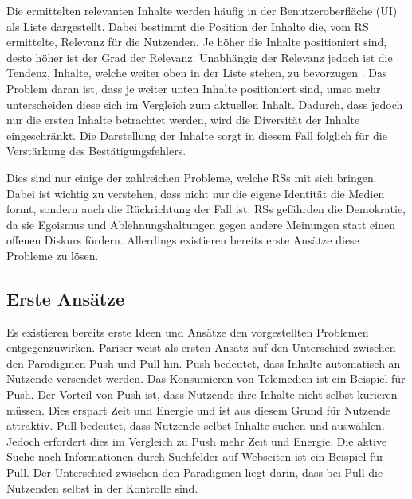 Die ermittelten relevanten Inhalte werden häufig in der Benutzeroberfläche (\ac{UI}) als Liste dargestellt.
Dabei bestimmt die Position der Inhalte die, vom \ac{RS} ermittelte, Relevanz für die Nutzenden.
Je höher die Inhalte positioniert sind, desto höher ist der Grad der Relevanz.
Unabhängig der Relevanz jedoch ist die Tendenz, Inhalte, welche weiter oben in der Liste stehen, zu bevorzugen \cite{position-bias}.
Das Problem daran ist, dass je weiter unten Inhalte positioniert sind, umso mehr unterscheiden diese sich im Vergleich zum aktuellen Inhalt.
Dadurch, dass jedoch nur die ersten Inhalte betrachtet werden, wird die Diversität der Inhalte eingeschränkt.
Die Darstellung der Inhalte sorgt in diesem Fall folglich für die Verstärkung des Bestätigungsfehlers.

Dies sind nur einige der zahlreichen Probleme, welche \acp{RS} mit sich bringen.
Dabei ist wichtig zu verstehen, dass nicht nur die eigene Identität die Medien formt, sondern auch die Rückrichtung der Fall ist.
\acp{RS} gefährden die Demokratie, da sie Egoismus und Ablehnungshaltungen gegen andere Meinungen statt einen offenen Diskurs fördern.
Allerdings existieren bereits erste Ansätze diese Probleme zu lösen.

\subsection{Erste Ansätze}
Es existieren bereits erste Ideen und Ansätze den vorgestellten Problemen entgegenzuwirken.
Pariser weist als ersten Ansatz auf den Unterschied zwischen den Paradigmen Push und Pull hin.
Push bedeutet, dass Inhalte automatisch an Nutzende versendet werden.
Das Konsumieren von Telemedien ist ein Beispiel für Push.
Der Vorteil von Push ist, dass Nutzende ihre Inhalte nicht selbst kurieren müssen.
Dies erspart Zeit und Energie und ist aus diesem Grund für Nutzende attraktiv.
Pull bedeutet, dass Nutzende selbst Inhalte suchen und auswählen.
Jedoch erfordert dies im Vergleich zu Push mehr Zeit und Energie.
Die aktive Suche nach Informationen durch Suchfelder auf Webseiten ist ein Beispiel für Pull.
Der Unterschied zwischen den Paradigmen liegt darin, dass bei Pull die Nutzenden selbst in der Kontrolle sind.\\





